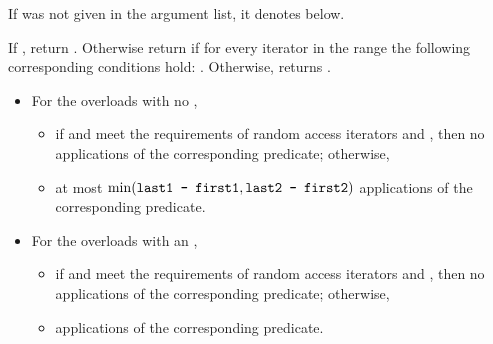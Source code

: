 \begin{itemdescr}
\pnum
\remarks If  was not given in the argument list, it denotes
 below.

\pnum
\returns
If
,
return
.
Otherwise return
if for every iterator
in the range 
the following corresponding conditions hold:
.
Otherwise, returns
.

\pnum
\complexity
\begin{itemize}
\item
For the overloads with no ,
\begin{itemize}
\item
if
and
meet the requirements of random access iterators
and
,
then
no applications of the corresponding predicate; otherwise,

\item
at most
$\min(\texttt{last1 - first1}, \texttt{last2 - first2})$
applications of the corresponding predicate.
\end{itemize}

\item
For the overloads with an ,
\begin{itemize}
\item
if
and
meet the requirements of random access iterators and
, then
no applications of the corresponding predicate; otherwise,

\item
{} applications
of the corresponding predicate.
\end{itemize}
\end{itemize}
\end{itemdescr}

